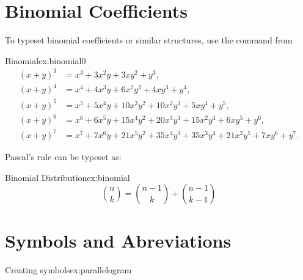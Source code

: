 {{{\section*{Binomial Coefficients}

To typeset binomial coefficients or similar structures, use the command
 from 

\begin{texexample}{Binomial}{ex:binomial0}
\[
\begin{align}
(x+y)^3 & = x^3 + 3x^2y + 3xy^2 + y^3, \\[8pt]
(x+y)^4 & = x^4 + 4x^3y + 6x^2y^2 + 4xy^3 + y^4, \\[8pt]
(x+y)^5 & = x^5 + 5x^4y + 10x^3y^2 + 10x^2y^3 + 5xy^4 + y^5, \\[8pt]
(x+y)^6 & = x^6 + 6x^5y + 15x^4y^2 + 20x^3y^3 + 15x^2y^4 + 6xy^5 + y^6, \\[8pt]
(x+y)^7 & = x^7 + 7x^6y + 21x^5y^2 + 35x^4y^3 + 35x^3y^4 + 21x^2y^5 + 7xy^6 + y^7.
\end{align}
\]
\end{texexample}


Pascal's rule can be typeset as:


\begin{texexample}{Binomial Distribution}{ex:binomial}
\[
\binom{n}{k} =\binom{n-1}{k}
+ \binom{n-1}{k-1}
\]
\end{texexample}



\section[Symbols and Abbreviations]{Symbols and Abreviations}
\label{math:abbreviations}

\label{abbr}\label{symbols}%

\begin{texexample}{Creating symbols}{ex:parallelogram}
\newlength{\dentwidth}\setlength{\dentwidth}{\textwidth}
\addtolength{\dentwidth}{-\parindent}

\makeatletter
\gdef\@parallelogram#1{%
  \textnormal{\setbox\z@\hbox{#1/}\dimen@\wd\z@
   \@tempdima 2.45\dimen@
   \vbox{\offinterlineskip
      \hbox{\kern.8\dimen@\vrule\@width\@tempdima\@height.4\p@}%
      \kern-.0\p@
      \hbox to\@tempdima{#1/\hfil\rlap/}%
      \kern-.5\p@
      \hbox{\kern.1\dimen@\vrule\@width\@tempdima\@height.4\p@}}}}
      
 \gdef\Par{%
   \mathchoice
      {\@parallelogram\scriptsize}%
      {\@parallelogram\scriptsize}%
      {\@parallelogram\tiny}%
      {\@parallelogram\tiny}}


\end{texexample}}}}

